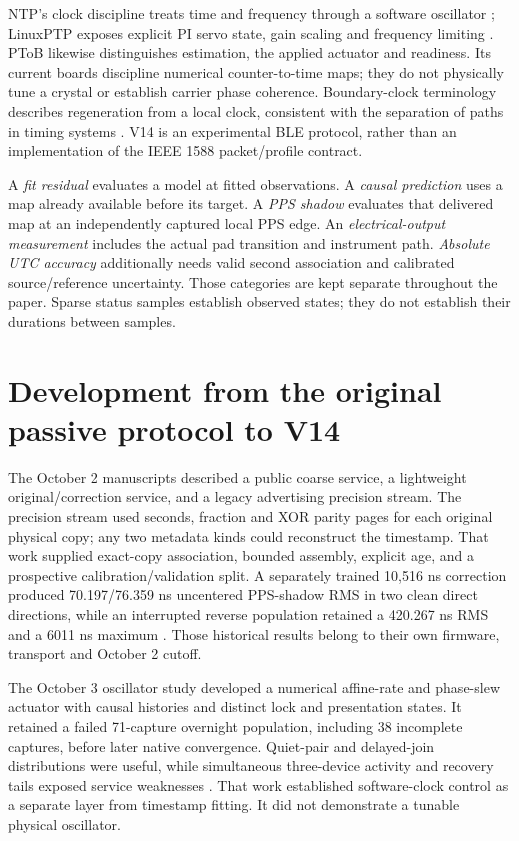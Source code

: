 \documentclass[11pt,letterpaper]{article}
\begin{document}
NTP's clock discipline treats time and frequency through a software oscillator \cite{ntp}; LinuxPTP exposes explicit PI servo state, gain scaling and frequency limiting \cite{linuxptp}. PToB likewise distinguishes estimation, the applied actuator and readiness. Its current boards discipline numerical counter-to-time maps; they do not physically tune a crystal or establish carrier phase coherence. Boundary-clock terminology describes regeneration from a local clock, consistent with the separation of paths in timing systems \cite{nistterms}. V14 is an experimental BLE protocol, rather than an implementation of the IEEE 1588 packet/profile contract.

A \emph{fit residual} evaluates a model at fitted observations. A \emph{causal prediction} uses a map already available before its target. A \emph{PPS shadow} evaluates that delivered map at an independently captured local PPS edge. An \emph{electrical-output measurement} includes the actual pad transition and instrument path. \emph{Absolute UTC accuracy} additionally needs valid second association and calibrated source/reference uncertainty. Those categories are kept separate throughout the paper. Sparse status samples establish observed states; they do not establish their durations between samples.

\section{Development from the original passive protocol to V14}\label{sec:history}
The October 2 manuscripts described a public coarse service, a lightweight original/correction service, and a legacy advertising precision stream. The precision stream used seconds, fraction and XOR parity pages for each original physical copy; any two metadata kinds could reconstruct the timestamp. That work supplied exact-copy association, bounded assembly, explicit age, and a prospective calibration/validation split. A separately trained 10,516 ns correction produced 70.197/76.359 ns uncentered PPS-shadow RMS in two clean direct directions, while an interrupted reverse population retained a 420.267 ns RMS and a 6011 ns maximum \cite{prior}. Those historical results belong to their own firmware, transport and October 2 cutoff.

The October 3 oscillator study developed a numerical affine-rate and phase-slew actuator with causal histories and distinct lock and presentation states. It retained a failed 71-capture overnight population, including 38 incomplete captures, before later native convergence. Quiet-pair and delayed-join distributions were useful, while simultaneous three-device activity and recovery tails exposed service weaknesses \cite{oscprior}. That work established software-clock control as a separate layer from timestamp fitting. It did not demonstrate a tunable physical oscillator.
\end{document}
